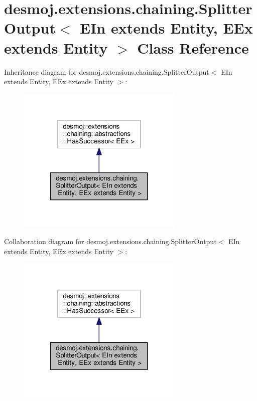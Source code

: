 \section{desmoj.\-extensions.\-chaining.\-Splitter\-Output$<$ E\-In extends Entity, E\-Ex extends Entity $>$ Class Reference}
\label{classdesmoj_1_1extensions_1_1chaining_1_1_splitter_output_3_01_e_in_01extends_01_entity_00_01_e_ex_01extends_01_entity_01_4}


Inheritance diagram for desmoj.\-extensions.\-chaining.\-Splitter\-Output$<$ E\-In extends Entity, E\-Ex extends Entity $>$\-:
\nopagebreak
\begin{figure}[H]
\begin{center}
\leavevmode
\includegraphics[width=224pt]{classdesmoj_1_1extensions_1_1chaining_1_1_splitter_output_3_01_e_in_01extends_01_entity_00_01_e_90290ab26d75b0dc43e22a20608d7833}
\end{center}
\end{figure}


Collaboration diagram for desmoj.\-extensions.\-chaining.\-Splitter\-Output$<$ E\-In extends Entity, E\-Ex extends Entity $>$\-:
\nopagebreak
\begin{figure}[H]
\begin{center}
\leavevmode
\includegraphics[width=224pt]{classdesmoj_1_1extensions_1_1chaining_1_1_splitter_output_3_01_e_in_01extends_01_entity_00_01_e_adc0f72a74b51f90f72f46bd32df5b59}
\end{center}
\end{figure}
